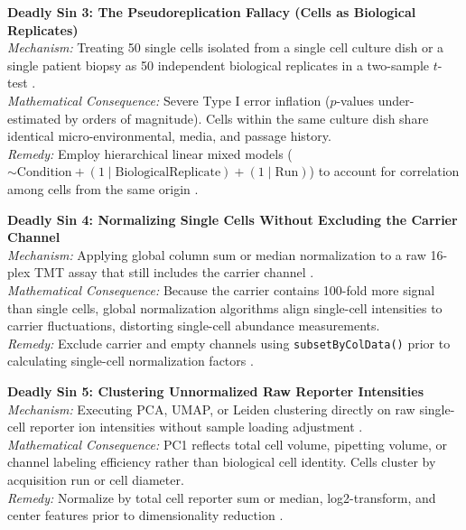 \documentclass[11pt,twoside,openright]{book}
\begin{document}
\begin{pitfallbox}
\textbf{Deadly Sin 3: The Pseudoreplication Fallacy (Cells as Biological Replicates)}\\
\textit{Mechanism:} Treating 50 single cells isolated from a single cell culture dish or a single patient biopsy as 50 independent biological replicates in a two-sample $t$-test \cite{amenta2022pseudoreplication}.\\
\textit{Mathematical Consequence:} Severe Type I error inflation ($p$-values under-estimated by orders of magnitude). Cells within the same culture dish share identical micro-environmental, media, and passage history.\\
\textit{Remedy:} Employ hierarchical linear mixed models ($\sim \text{Condition} + (1 \mid \text{BiologicalReplicate}) + (1 \mid \text{Run})$) to account for correlation among cells from the same origin \cite{bates2015fitting}.
\end{pitfallbox}

\begin{pitfallbox}
\textbf{Deadly Sin 4: Normalizing Single Cells Without Excluding the Carrier Channel}\\
\textit{Mechanism:} Applying global column sum or median normalization to a raw 16-plex TMT assay that still includes the carrier channel \cite{vanderaa2024using}.\\
\textit{Mathematical Consequence:} Because the carrier contains 100-fold more signal than single cells, global normalization algorithms align single-cell intensities to carrier fluctuations, distorting single-cell abundance measurements.\\
\textit{Remedy:} Exclude carrier and empty channels using \texttt{subsetByColData()} prior to calculating single-cell normalization factors \cite{petelski2021multiplexed}.
\end{pitfallbox}

\begin{pitfallbox}
\textbf{Deadly Sin 5: Clustering Unnormalized Raw Reporter Intensities}\\
\textit{Mechanism:} Executing PCA, UMAP, or Leiden clustering directly on raw single-cell reporter ion intensities without sample loading adjustment \cite{specht2021single}.\\
\textit{Mathematical Consequence:} PC1 reflects total cell volume, pipetting volume, or channel labeling efficiency rather than biological cell identity. Cells cluster by acquisition run or cell diameter.\\
\textit{Remedy:} Normalize by total cell reporter sum or median, log2-transform, and center features prior to dimensionality reduction \cite{vanderaa2023scppackage}.
\end{pitfallbox}
\end{document}
